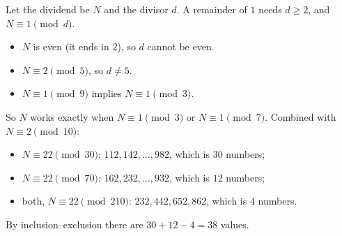Let the dividend be $N$ and the divisor $d$. A remainder of $1$ needs $d\ge2$, and $N\equiv1\pmod d$.
\begin{itemize}
\item $N$ is even (it ends in $2$), so $d$ cannot be even.
\item $N\equiv2\pmod5$, so $d\ne5$.
\item $N\equiv1\pmod9$ implies $N\equiv1\pmod3$.
\end{itemize}
So $N$ works exactly when $N\equiv1\pmod3$ or $N\equiv1\pmod7$. Combined with $N\equiv2\pmod{10}$:
\begin{itemize}
\item $N\equiv22\pmod{30}$: $112,142,\dots,982$, which is $30$ numbers;
\item $N\equiv22\pmod{70}$: $162,232,\dots,932$, which is $12$ numbers;
\item both, $N\equiv22\pmod{210}$: $232,442,652,862$, which is $4$ numbers.
\end{itemize}
By inclusion--exclusion there are $30+12-4=\boxed{38}$ values.
